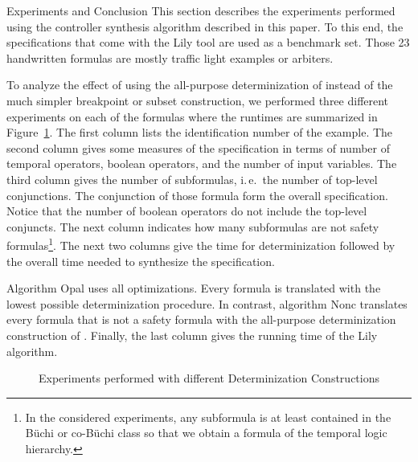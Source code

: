 \documentclass[copyright,creativecommons]{eptcs}
\newcommand{\ie}{i.\,e.~}
\begin{document}
\begin{section}{Experiments and Conclusion}
\label{ExperimentalResults}
This section describes the experiments performed using the controller synthesis algorithm described in this paper. To this end, the  specifications that come with the Lily tool \cite{JoBl06} are used as a benchmark set. Those 23 handwritten formulas are mostly traffic light examples or arbiters.

To analyze the effect of using the all-purpose determinization of \cite{MoSc08} instead of the much simpler breakpoint or subset construction, we performed three different experiments on each of the formulas where the runtimes are summarized in Figure~\ref{table:det_table}. The first column lists the identification number of the example. The second column gives some measures of the specification in terms of number of temporal operators, boolean operators, and the number of input variables. The third column gives the number of subformulas, \ie the number of top-level conjunctions. The conjunction of those formula form the overall specification. Notice that the number of boolean operators do not include the top-level conjuncts. The next column indicates how many subformulas are not safety formulas\footnote{In the considered experiments, any subformula is at least contained in the Büchi or co-Büchi class so that we obtain a formula of the temporal logic hierarchy.}. The next two columns give the time for determinization followed by the overall time needed to synthesize the specification.

Algorithm Opal uses all optimizations. Every formula is translated with the lowest possible determinization procedure. In contrast, algorithm Nonc translates every formula that is not a safety formula with the all-purpose determinization construction of \cite{MoSc08}. Finally, the last column gives the running time of the Lily algorithm.

\begin{figure}
\centering
{}
\endpgfgraphicnamed
\caption{Experiments performed with different Determinization Constructions}
\label{table:det_table}
\end{figure}


\end{section}
\end{document}
